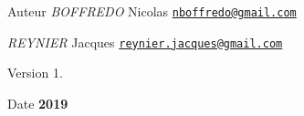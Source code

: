 \begin{DoxyAuthor}{Auteur}
{\itshape B\+O\+F\+F\+R\+E\+DO} Nicolas \href{mailto:nboffredo@gmail.com}{\tt nboffredo@gmail.\+com} 

{\itshape R\+E\+Y\+N\+I\+ER} Jacques \href{mailto:reynier.jacques@gmail.com}{\tt reynier.\+jacques@gmail.\+com} 
\end{DoxyAuthor}
\begin{DoxyVersion}{Version}
1. 
\end{DoxyVersion}
\begin{DoxyDate}{Date}
{\bfseries 2019} 
\end{DoxyDate}
